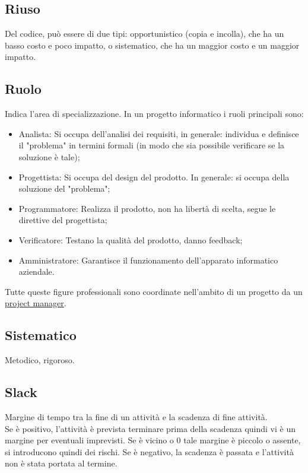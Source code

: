 	\subsection{Riuso}
	\label{sec:riuso}
	Del codice, può essere di due tipi: opportunistico (copia e incolla), che ha un basso costo e poco impatto, o sistematico, che ha un maggior costo e un maggior impatto.		

	\subsection{Ruolo}
	\label{sec:ruolo}
	Indica l'area di specializzazione.
	In un progetto informatico i ruoli principali sono:
	\begin{itemize}  
	\item Analista: Si occupa dell'analisi dei requisiti, in generale: individua e definisce il "problema" in termini formali (in modo che sia possibile verificare se la soluzione è tale);
	\item Progettista: Si occupa del design del prodotto. In generale: si occupa della soluzione del "problema";
	\item Programmatore: Realizza il prodotto, non ha libertà di scelta, segue le direttive del progettista;
	\item Verificatore: Testano la qualità del prodotto, danno feedback;
	\item Amministratore: Garantisce il funzionamento dell'apparato informatico aziendale. 
	\end{itemize}
	Tutte queste figure professionali sono coordinate nell'ambito di un progetto da un \underline{\hyperref[sec:projectmanager]{project manager}}.
	\newpage
	

	\subsection{Sistematico}
	\label{sec:sistematico}
	Metodico, rigoroso.

	\subsection{Slack}
	\label{sec:slack}
	Margine di tempo tra la fine di un attività e la scadenza di fine attività. \\
	Se è positivo, l'attività è prevista terminare prima della scadenza quindi vi è un margine per eventuali imprevisti. Se è vicino o 0 tale margine è piccolo o assente, si introducono quindi dei rischi. Se è negativo, la scadenza è passata e l'attività non è stata portata al termine.
	
